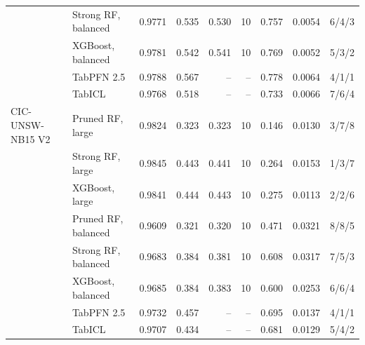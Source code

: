 \begin{tabular}{@{}llrrrrrrr@{}}
 & Strong RF, balanced & 0.9771 & 0.535 & 0.530 & 10 & 0.757 & 0.0054 & 6/4/3 \\
 & XGBoost, balanced & 0.9781 & 0.542 & 0.541 & 10 & 0.769 & 0.0052 & 5/3/2 \\
 & TabPFN 2.5 & 0.9788 & 0.567 & -- & -- & 0.778 & 0.0064 & 4/1/1 \\
 & TabICL & 0.9768 & 0.518 & -- & -- & 0.733 & 0.0066 & 7/6/4 \\
\addlinespace
CIC-UNSW-NB15 V2 & Pruned RF, large & 0.9824 & 0.323 & 0.323 & 10 & 0.146 & 0.0130 & 3/7/8 \\
 & Strong RF, large & 0.9845 & 0.443 & 0.441 & 10 & 0.264 & 0.0153 & 1/3/7 \\
 & XGBoost, large & 0.9841 & 0.444 & 0.443 & 10 & 0.275 & 0.0113 & 2/2/6 \\
 & Pruned RF, balanced & 0.9609 & 0.321 & 0.320 & 10 & 0.471 & 0.0321 & 8/8/5 \\
 & Strong RF, balanced & 0.9683 & 0.384 & 0.381 & 10 & 0.608 & 0.0317 & 7/5/3 \\
 & XGBoost, balanced & 0.9685 & 0.384 & 0.383 & 10 & 0.600 & 0.0253 & 6/6/4 \\
 & TabPFN 2.5 & 0.9732 & 0.457 & -- & -- & 0.695 & 0.0137 & 4/1/1 \\
 & TabICL & 0.9707 & 0.434 & -- & -- & 0.681 & 0.0129 & 5/4/2 \\
\bottomrule
\end{tabular}
